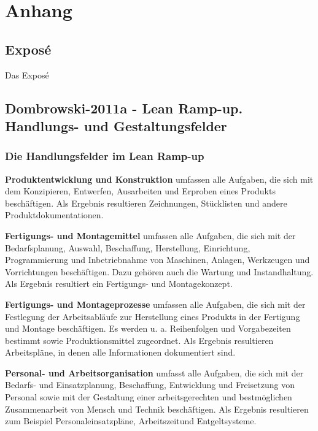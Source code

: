 \chapter{Anhang}
\section{Exposé}
Das Exposé 

\section{Dombrowski-2011a - Lean Ramp-up. Handlungs- und Gestaltungsfelder}
\subsection*{Die Handlungsfelder im Lean Ramp-up}\label{appendix:dom11a:hf}

\textbf{Produktentwicklung und Konstruktion}
umfassen alle Aufgaben, die sich mit
dem Konzipieren, Entwerfen, Ausarbeiten und Erproben eines Produkts
beschäftigen. Als Ergebnis resultieren Zeichnungen, Stücklisten und andere Produktdokumentationen.

\textbf{Fertigungs- und Montagemittel} umfassen alle Aufgaben, die sich mit der Bedarfsplanung, Auswahl, Beschaffung,
Herstellung, Einrichtung, Programmierung und Inbetriebnahme von Maschinen, Anlagen, Werkzeugen und
Vorrichtungen beschäftigen. Dazu gehören auch die Wartung und Instandhaltung. Als Ergebnis resultiert ein
Fertigungs- und Montagekonzept.

\textbf{Fertigungs- und Montageprozesse} umfassen alle Aufgaben, die sich mit der
Festlegung der Arbeitsabläufe zur
Herstellung eines Produkts in der
Fertigung und Montage beschäftigen.
Es werden u. a. Reihenfolgen und
Vorgabezeiten bestimmt sowie Produktionsmittel zugeordnet. Als Ergebnis resultieren Arbeitspläne, in
denen alle Informationen dokumentiert sind.

\textbf{Personal- und Arbeitsorganisation} umfasst alle Aufgaben, die sich mit der
Bedarfs- und Einsatzplanung, Beschaffung, Entwicklung und Freisetzung von Personal sowie mit der Gestaltung einer arbeitsgerechten und
bestmöglichen Zusammenarbeit von
Mensch und Technik beschäftigen.
Als Ergebnis resultieren zum Beispiel
Personaleinsatzpläne,
 Arbeitszeitund Entgeltsysteme.

